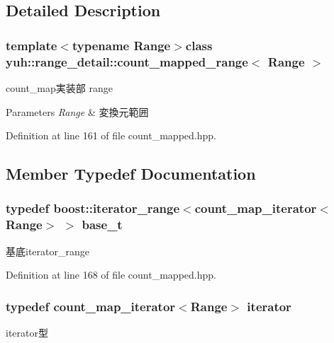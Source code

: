 \subsection{\-Detailed \-Description}
\subsubsection*{template$<$typename Range$>$class yuh\-::range\-\_\-detail\-::count\-\_\-mapped\-\_\-range$<$ Range $>$}

count\-\_\-map実装部 range 
\begin{DoxyParams}{\-Parameters}
{\em \-Range} & 変換元範囲 \\
\hline
\end{DoxyParams}


\-Definition at line 161 of file count\-\_\-mapped.\-hpp.



\subsection{\-Member \-Typedef \-Documentation}
\hypertarget{classyuh_1_1range__detail_1_1count__mapped__range_aa0cbd1ef3bd1e7da04065061ffa97ccf}{
\subsubsection[{base\-\_\-t}]{\setlength{\rightskip}{0pt plus 5cm}typedef boost\-::iterator\-\_\-range$<${\bf count\-\_\-map\-\_\-iterator}$<$\-Range$>$ $>$ {\bf base\-\_\-t}}}\label{dc/d9d/classyuh_1_1range__detail_1_1count__mapped__range_aa0cbd1ef3bd1e7da04065061ffa97ccf}
基底iterator\-\_\-range 

\-Definition at line 168 of file count\-\_\-mapped.\-hpp.

\hypertarget{classyuh_1_1range__detail_1_1count__mapped__range_a01b1f59fe1260c78c27cae74822ff00f}{
\subsubsection[{iterator}]{\setlength{\rightskip}{0pt plus 5cm}typedef {\bf count\-\_\-map\-\_\-iterator}$<$\-Range$>$ {\bf iterator}}}\label{dc/d9d/classyuh_1_1range__detail_1_1count__mapped__range_a01b1f59fe1260c78c27cae74822ff00f}
iterator型 

